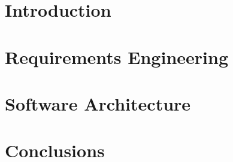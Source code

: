 \documentclass{sig-alternate-05-2015}
\begin{document}

\section{Introduction}

\section{Requirements Engineering}

\section{Software Architecture}

\section{Conclusions}



\balancecolumns{}
\end{document}
